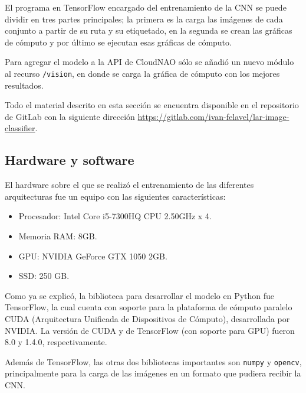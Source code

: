 El programa en TensorFlow encargado del entrenamiento de la CNN se puede dividir en tres partes principales; la primera es la carga las imágenes de cada conjunto a partir de su ruta y su etiquetado, en la segunda
se crean las gráficas de cómputo y por último se ejecutan esas gráficas de cómputo.

Para agregar el modelo a la API de CloudNAO sólo se añadió un nuevo módulo
al recurso \texttt{/vision}, en donde se carga la gráfica de cómputo 
con los mejores resultados.

Todo el material descrito en esta sección se encuentra disponible en el
repositorio de GitLab
con la siguiente dirección
\url{https://gitlab.com/ivan-felavel/lar-image-classifier}.


\subsection{Hardware y software}

El hardware sobre el que se realizó el entrenamiento de las
diferentes arquitecturas fue un equipo con las siguientes características:

\begin{itemize}

\item Procesador: Intel Core i5-7300HQ CPU 2.50GHz x 4.
\item Memoria RAM: 8GB.
\item GPU:  NVIDIA GeForce GTX 1050 2GB.
\item SSD: 250 GB.
\end{itemize}

Como ya se explicó, la biblioteca para desarrollar el modelo en Python fue TensorFlow, la cual cuenta
con soporte para la plataforma de cómputo paralelo CUDA (Arquitectura
Unificada de Dispositivos de Cómputo), desarrollada por NVIDIA.
La versión de CUDA y de TensorFlow (con soporte para GPU) fueron 8.0 y 1.4.0, respectivamente.

Además de TensorFlow, las otras dos bibliotecas importantes son 
\texttt{numpy} y \texttt{opencv}, principalmente para la carga de
las imágenes en un formato que pudiera recibir la CNN.


